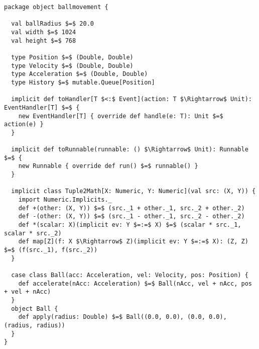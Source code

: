 \begin{lstlisting}[style=ScalaStyle, caption={Ball movement control}, label={lst:ball-full-utils}]
package object ballmovement {

  val ballRadius $=$ 20.0
  val width $=$ 1024
  val height $=$ 768

  type Position $=$ (Double, Double)
  type Velocity $=$ (Double, Double)
  type Acceleration $=$ (Double, Double)
  type History $=$ mutable.Queue[Position]
  
  implicit def toHandler[T $<:$ Event](action: T $\Rightarrow$ Unit): EventHandler[T] $=$ {
    new EventHandler[T] { override def handle(e: T): Unit $=$ action(e) }
  }

  implicit def toRunnable(runnable: () $\Rightarrow$ Unit): Runnable $=$ {
    new Runnable { override def run() $=$ runnable() }
  }

  implicit class Tuple2Math[X: Numeric, Y: Numeric](val src: (X, Y)) {
    import Numeric.Implicits._
    def +(other: (X, Y)) $=$ (src._1 + other._1, src._2 + other._2)
    def -(other: (X, Y)) $=$ (src._1 - other._1, src._2 - other._2)
    def *(scalar: X)(implicit ev: Y $=:=$ X) $=$ (scalar * src._1, scalar * src._2)
    def map[Z](f: X $\Rightarrow$ Z)(implicit ev: Y $=:=$ X): (Z, Z) $=$ (f(src._1), f(src._2))
  }

  case class Ball(acc: Acceleration, vel: Velocity, pos: Position) {
    def accelerate(nAcc: Acceleration) $=$ Ball(nAcc, vel + nAcc, pos + vel + nAcc)
  }
  object Ball {
    def apply(radius: Double) $=$ Ball((0.0, 0.0), (0.0, 0.0), (radius, radius))
  }
}
\end{lstlisting}
